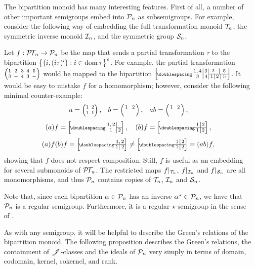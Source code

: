 The bipartition monoid has many interesting features.  First of all, a number of
other important semigroups embed into $\mathcal{P}_n$ as subsemigroups.  For example,
consider the following way of embedding the full transformation monoid $\mathcal{T}_n$,
the symmetric inverse monoid $\mathcal{I}_n$, and the symmetric group $\mathcal{S}_n$.

\begin{example}
  \label{ex:ptn-to-pn}
  Let $f : \mathcal{P\!T\!}_n \to \mathcal{P}_n$ be the map that sends a partial transformation
  $\tau$ to the bipartition
  $\left\{\big(i, (i\tau)'\big) : i \in \operatorname{dom} \tau\right\}^e$.  For example, the
  partial transformation $\transV3-43-$ would be mapped to the bipartition
  $\bipart{c|c|c|c|c}{3-5}{1,4 & 3 & \two{2}{5}}{3 & 4 & 1 & 2 & 5}$.  It would
  be easy to mistake $f$ for a homomorphism; however, consider the following
  minimal counter-example:
  $$a = \transII11, \quad b = \transII--,\quad ab = \transII--,$$
  $$(a)f = \bipart{c|c}{2-2}{1,2 &}{1 & 2},\quad
  (b)f = \bipart{c|c}{1-2}{1 & 2}{1 & 2},$$
  $$(a)f(b)f = \bipart{c|c}{1-2}{\mc2{c}{1,2}}{1 & 2} \neq
  \bipart{c|c}{1-2}{1 & 2}{1 & 2} = (ab)f,$$
  showing that $f$ does not respect composition.  Still, $f$ is useful as an
  embedding for several submonoids of $\mathcal{P\!T\!}_n$.  The restricted maps $f|_{\mathcal{T}_n}$,
  $f|_{\mathcal{I}_n}$ and $f|_{\mathcal{S}_n}$ are all monomorphisms, and thus $\mathcal{P}_n$
  contains copies of $\mathcal{T}_n$, $\mathcal{I}_n$ and $\mathcal{S}_n$.
\end{example}

Note that, since each bipartition $\alpha \in \mathcal{P}_n$ has an inverse
$\alpha^\star \in \mathcal{P}_n$, we have that $\mathcal{P}_n$ is a regular semigroup.
Furthermore, it is a regular $\star$-semigroup in the sense of
\cite{reg_star_smgp}.

As with any semigroup, it will be helpful to describe the Green's relations of
the bipartition monoid.  The following proposition describes the Green's
relations, the containment of $\mathrel{\mathscr{J}}$-classes and the ideals of $\mathcal{P}_n$ very
simply in terms of domain, codomain, kernel, cokernel, and rank.

